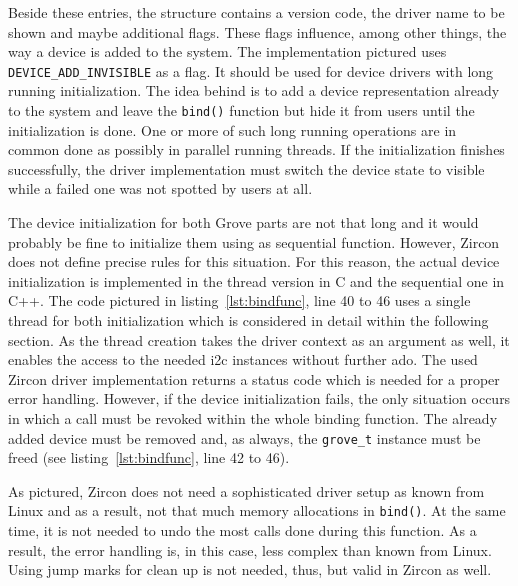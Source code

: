 Beside these entries, the structure contains a version code, the driver name to be shown and maybe additional flags.
These flags influence, among other things, the way a device is added to the system.
The implementation pictured uses \\ \texttt{DEVICE_ADD_INVISIBLE} as a flag.
It should be used for device drivers with long running initialization.
The idea behind is to add a device representation already to the system and leave the \texttt{bind()} function but hide it from users until the initialization is done.
One or more of such long running operations are in common done as possibly in parallel running threads.
If the initialization finishes successfully, the driver implementation must switch the device state to visible while a failed one was not spotted by users at all.

The device initialization for both Grove parts are not that long and it would probably be fine to initialize them using as sequential function.
However, Zircon does not define precise rules for this situation.
For this reason, the actual device initialization is implemented in the thread version in C and the sequential one in C++.
The code pictured in listing~\ref{lst:bindfunc}, line 40 to 46 uses a single thread for both initialization which is considered in detail within the following section.
As the thread creation takes the driver context as an argument as well, it enables the access to the needed \ac{i2c} instances without further ado.
The used Zircon driver implementation returns a status code which is needed for a proper error handling.
However, if the device initialization fails, the only situation occurs in which a call must be revoked within the whole binding function.
The already added device must be removed and, as always, the \texttt{grove_t} instance must be freed (see listing~\ref{lst:bindfunc}, line 42 to 46).

As pictured, Zircon does not need a sophisticated driver setup as known from Linux and as a result, not that much memory allocations in \texttt{bind()}.
At the same time, it is not needed to undo the most calls done during this function.
As a result, the error handling is, in this case, less complex than known from Linux.
Using jump marks for clean up is not needed, thus, but valid in Zircon as well.

